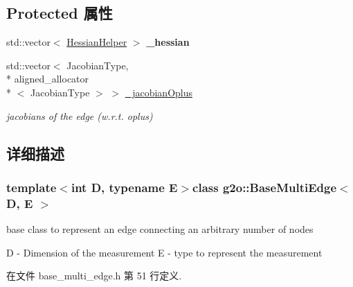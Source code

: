 \subsection*{Protected 属性}
\begin{DoxyCompactItemize}
\item 
\hypertarget{classg2o_1_1BaseMultiEdge_af927d6f41bf73fc3b928cae2d6219d9e}{std\-::vector$<$ \hyperlink{structg2o_1_1BaseMultiEdge_1_1HessianHelper}{Hessian\-Helper} $>$ {\bfseries \-\_\-hessian}}\label{classg2o_1_1BaseMultiEdge_af927d6f41bf73fc3b928cae2d6219d9e}

\item 
\hypertarget{classg2o_1_1BaseMultiEdge_a00f8130e287bc945a8436375c4d07a02}{std\-::vector$<$ Jacobian\-Type, \\*
aligned\-\_\-allocator\\*
$<$ Jacobian\-Type $>$ $>$ \hyperlink{classg2o_1_1BaseMultiEdge_a00f8130e287bc945a8436375c4d07a02}{\-\_\-jacobian\-Oplus}}\label{classg2o_1_1BaseMultiEdge_a00f8130e287bc945a8436375c4d07a02}

\begin{DoxyCompactList}\small\item\em jacobians of the edge (w.\-r.\-t. oplus) \end{DoxyCompactList}\end{DoxyCompactItemize}


\subsection{详细描述}
\subsubsection*{template$<$int D, typename E$>$class g2o\-::\-Base\-Multi\-Edge$<$ D, E $>$}

base class to represent an edge connecting an arbitrary number of nodes 

D -\/ Dimension of the measurement E -\/ type to represent the measurement 

在文件 base\-\_\-multi\-\_\-edge.\-h 第 51 行定义.



